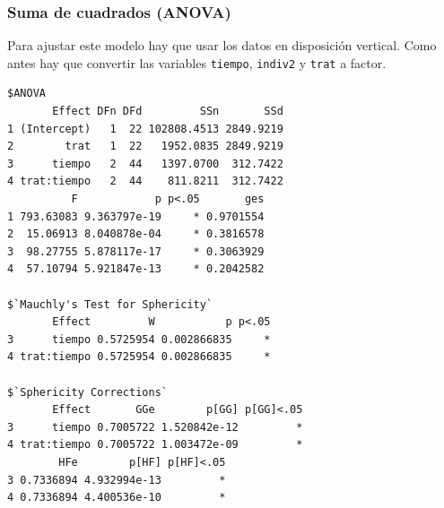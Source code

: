 \documentclass[
]{book}
\newenvironment{Shaded}{\begin{snugshade}}{\end{snugshade}}
\newcommand{\AttributeTok}[1]{\textcolor[rgb]{0.77,0.63,0.00}{#1}}
\newcommand{\ConstantTok}[1]{\textcolor[rgb]{0.00,0.00,0.00}{#1}}
\newcommand{\FunctionTok}[1]{\textcolor[rgb]{0.00,0.00,0.00}{#1}}
\newcommand{\NormalTok}[1]{#1}
\newcommand{\OtherTok}[1]{\textcolor[rgb]{0.56,0.35,0.01}{#1}}
\newcommand{\SpecialCharTok}[1]{\textcolor[rgb]{0.00,0.00,0.00}{#1}}
\begin{document}
\hypertarget{suma-de-cuadrados-anova-1}{%
\subsubsection{Suma de cuadrados (ANOVA)}\label{suma-de-cuadrados-anova-1}}

Para ajustar este modelo hay que usar los datos en disposición vertical.
Como antes hay que convertir las variables \texttt{tiempo}, \texttt{indiv2} y \texttt{trat} a factor.

\begin{Shaded}
\end{Shaded}

\begin{verbatim}
$ANOVA
       Effect DFn DFd         SSn       SSd
1 (Intercept)   1  22 102808.4513 2849.9219
2        trat   1  22   1952.0835 2849.9219
3      tiempo   2  44   1397.0700  312.7422
4 trat:tiempo   2  44    811.8211  312.7422
          F            p p<.05       ges
1 793.63083 9.363797e-19     * 0.9701554
2  15.06913 8.040878e-04     * 0.3816578
3  98.27755 5.878117e-17     * 0.3063929
4  57.10794 5.921847e-13     * 0.2042582

$`Mauchly's Test for Sphericity`
       Effect         W           p p<.05
3      tiempo 0.5725954 0.002866835     *
4 trat:tiempo 0.5725954 0.002866835     *

$`Sphericity Corrections`
       Effect       GGe        p[GG] p[GG]<.05
3      tiempo 0.7005722 1.520842e-12         *
4 trat:tiempo 0.7005722 1.003472e-09         *
        HFe        p[HF] p[HF]<.05
3 0.7336894 4.932994e-13         *
4 0.7336894 4.400536e-10         *
\end{verbatim}
\end{document}
